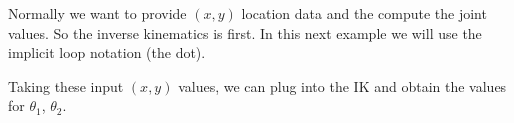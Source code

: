 Normally we want to provide \((x,y)\) location data and the compute the
joint values. So the inverse kinematics is first. In this next example
we will use the implicit loop notation (the dot).

\begin{Shaded}
\begin{Highlighting}[]
\OperatorTok{=} 
\OperatorTok{=}\OperatorTok{,} \OperatorTok{,}\OperatorTok{=}
\OperatorTok{=}\OperatorTok{+} 
\OperatorTok{=}  \OperatorTok{{-}} 
\OperatorTok{,}\OperatorTok{,}\OperatorTok{=}\OperatorTok{,}\OperatorTok{=} \OperatorTok{:}\OperatorTok{,}\OperatorTok{=}\NormalTok{)}
\end{Highlighting}
\end{Shaded}

Taking these input \((x,y)\) values, we can plug into the IK and obtain
the values for \(\theta_1\), \(\theta_2\).

\begin{Shaded}
\begin{Highlighting}[]
\OperatorTok{,}\OperatorTok{=} \OperatorTok{,}
\OperatorTok{=}\OperatorTok{+}\OperatorTok{{-}}\OperatorTok{{-}}\OperatorTok{/}\NormalTok{(} 
 \OperatorTok{=}\OperatorTok{{-}}\OperatorTok{{-}}\OperatorTok{,}
 \OperatorTok{=}\OperatorTok{,}\OperatorTok{{-}}\NormalTok{)}\OperatorTok{,}\OperatorTok{+}\NormalTok{))}
\OperatorTok{,}\OperatorTok{,}\OperatorTok{=}\OperatorTok{,}\OperatorTok{=} \OperatorTok{:}\OperatorTok{,}\OperatorTok{=} \NormalTok{)}
\end{Highlighting}
\end{Shaded}


